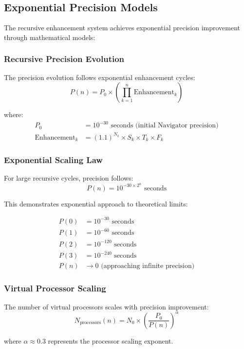 \documentclass[12pt,a4paper]{article}
\begin{document}
{{{{{{\subsection{Exponential Precision Models}

The recursive enhancement system achieves exponential precision improvement through mathematical models:

\subsubsection{Recursive Precision Evolution}

The precision evolution follows exponential enhancement cycles:
$$P(n) = P_0 \times \left(\prod_{k=1}^{n} \text{Enhancement}_k\right)$$

where:
\begin{align}
P_0 &= 10^{-30} \text{ seconds (initial Navigator precision)} \\
\text{Enhancement}_k &= (1.1)^{N_k} \times S_k \times T_k \times F_k
\end{align}

\subsubsection{Exponential Scaling Law}

For large recursive cycles, precision follows:
$$P(n) = 10^{-30 \times 2^n} \text{ seconds}$$

This demonstrates exponential approach to theoretical limits:

\begin{align}
P(0) &= 10^{-30} \text{ seconds} \\
P(1) &= 10^{-60} \text{ seconds} \\
P(2) &= 10^{-120} \text{ seconds} \\
P(3) &= 10^{-240} \text{ seconds} \\
P(n) &\rightarrow 0 \text{ (approaching infinite precision)}
\end{align}

\subsubsection{Virtual Processor Scaling}

The number of virtual processors scales with precision improvement:
$$N_{\text{processors}}(n) = N_0 \times \left(\frac{P_0}{P(n)}\right)^{\alpha}$$

where $\alpha \approx 0.3$ represents the processor scaling exponent.

}}}}}}
\end{document}
